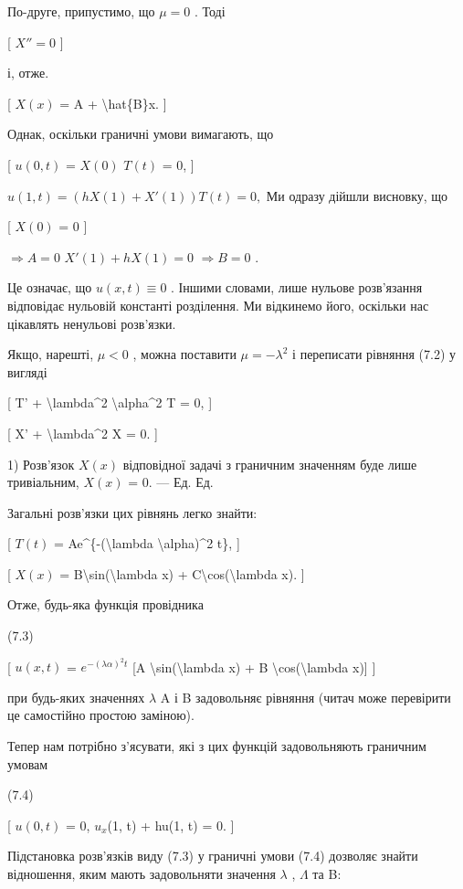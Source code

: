 \documentclass[
]{article}
\begin{document}
{{По-друге, припустимо, що \(\mu = 0\) . Тоді

{[} \(X'' = 0\) {]}

і, отже.

{[} \(X(x)\) = A + \textbackslash hat\{B\}x. {]}

Однак, оскільки граничні умови вимагають, що

{[} \(u(0, t)\) = \(X(0)\) \(T(t)\) = 0, {]}

\(u(1, t) = (hX(1) + X'(1)) T(t) = 0,\) Ми одразу дійшли висновку, що

{[} \(X(0)\) = 0 {]}

\(\Rightarrow A = 0\) \(X'(1) + hX(1) = 0\) \(\Rightarrow B = 0\) .

Це означає, що \(u(x, t) \equiv 0\) . Іншими словами, лише нульове
розв'язання відповідає нульовій константі розділення. Ми відкинемо його,
оскільки нас цікавлять ненульові розв'язки.

Якщо, нарешті, \(\mu < 0\) , можна поставити \(\mu = -\lambda^2\) і
переписати рівняння (7.2) у вигляді

{[} T' + \textbackslash lambda\^{}2 \textbackslash alpha\^{}2 T = 0, {]}

{[} X' + \textbackslash lambda\^{}2 X = 0. {]}

1) Розв'язок \(X(x)\) відповідної задачі з граничним значенням буде лише
тривіальним, \(X(x)\) = 0. --- Ед. Ед.

Загальні розв'язки цих рівнянь легко знайти:

{[} \(T(t)\) = Ae\^{}\{-(\textbackslash lambda
\textbackslash alpha)\^{}2 t\}, {]}

{[} \(X(x)\) = B\textbackslash sin(\textbackslash lambda x) +
C\textbackslash cos(\textbackslash lambda x). {]}

Отже, будь-яка функція провідника

(7.3)

{[} \(u(x, t)\) = \(e^{-(\lambda \alpha)^2 t}\) {[}A
\textbackslash sin(\textbackslash lambda x) + B
\textbackslash cos(\textbackslash lambda x){]} {]}

при будь-яких значеннях \(\lambda\) A і B задовольняє рівняння (читач
може перевірити це самостійно простою заміною).

Тепер нам потрібно з'ясувати, які з цих функцій задовольняють граничним
умовам

(7.4)

{[} \(u(0, t)\) = 0, \(u_x\)(1, t) + hu(1, t) = 0. {]}

Підстановка розв'язків виду (7.3) у граничні умови (7.4) дозволяє знайти
відношення, яким мають задовольняти значення \(\lambda\) , \(\Lambda\)
та B:

}}
\end{document}
